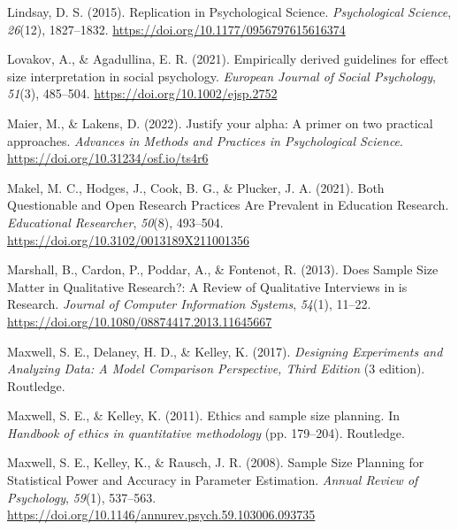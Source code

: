 \documentclass[
  letterpaper,
  DIV=11,
  numbers=noendperiod]{scrreprt}
\newlength{\cslhangindent}
\newlength{\cslentryspacingunit} %
\newenvironment{CSLReferences}[2] %
 {%
  \setlength{\parindent}{0pt}
  \ifodd #1
  \let\oldpar\par
  \def\par{\hangindent=\cslhangindent\oldpar}
  \fi
  \setlength{\parskip}{#2\cslentryspacingunit}
 }%
 {}
\begin{document}
\begin{CSLReferences}{1}{0}
\leavevmode{}%
Lindsay, D. S. (2015). Replication in {Psychological Science}.
\emph{Psychological Science}, \emph{26}(12), 1827--1832.
\url{https://doi.org/10.1177/0956797615616374}

\leavevmode{}%
Lovakov, A., \& Agadullina, E. R. (2021). Empirically derived guidelines
for effect size interpretation in social psychology. \emph{European
Journal of Social Psychology}, \emph{51}(3), 485--504.
\url{https://doi.org/10.1002/ejsp.2752}

\leavevmode{}%
Maier, M., \& Lakens, D. (2022). Justify your alpha: {A} primer on two
practical approaches. \emph{Advances in Methods and Practices in
Psychological Science}. \url{https://doi.org/10.31234/osf.io/ts4r6}

\leavevmode{}%
Makel, M. C., Hodges, J., Cook, B. G., \& Plucker, J. A. (2021). Both
{Questionable} and {Open Research Practices Are Prevalent} in {Education
Research}. \emph{Educational Researcher}, \emph{50}(8), 493--504.
\url{https://doi.org/10.3102/0013189X211001356}

\leavevmode{}%
Marshall, B., Cardon, P., Poddar, A., \& Fontenot, R. (2013). Does
{Sample Size Matter} in {Qualitative Research}?: {A Review} of
{Qualitative Interviews} in is {Research}. \emph{Journal of Computer
Information Systems}, \emph{54}(1), 11--22.
\url{https://doi.org/10.1080/08874417.2013.11645667}

\leavevmode{}%
Maxwell, S. E., Delaney, H. D., \& Kelley, K. (2017). \emph{Designing
{Experiments} and {Analyzing Data}: {A Model Comparison Perspective},
{Third Edition}} (3 edition). {Routledge}.

\leavevmode{}%
Maxwell, S. E., \& Kelley, K. (2011). Ethics and sample size planning.
In \emph{Handbook of ethics in quantitative methodology} (pp. 179--204).
{Routledge}.

\leavevmode{}%
Maxwell, S. E., Kelley, K., \& Rausch, J. R. (2008). Sample {Size
Planning} for {Statistical Power} and {Accuracy} in {Parameter
Estimation}. \emph{Annual Review of Psychology}, \emph{59}(1), 537--563.
\url{https://doi.org/10.1146/annurev.psych.59.103006.093735}


\end{CSLReferences}
\end{document}
